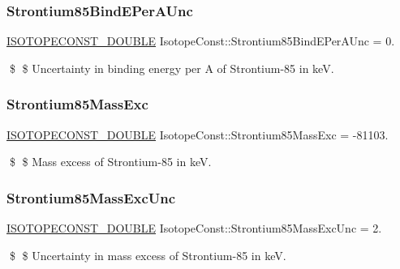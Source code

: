 \subsubsection{\texorpdfstring{Strontium85\+Bind\+E\+Per\+A\+Unc}{Strontium85BindEPerAUnc}}
{\footnotesize\ttfamily \mbox{\hyperlink{group___isotope_const-_macros_ga8f45a7272ce02c0b4c65c44636ed719a}{I\+S\+O\+T\+O\+P\+E\+C\+O\+N\+S\+T\+\_\+\+D\+O\+U\+B\+LE}} Isotope\+Const\+::\+Strontium85\+Bind\+E\+Per\+A\+Unc = 0.}

\$ \$ Uncertainty in binding energy per A of Strontium-\/85 in keV. \mbox{\label{group___isotope_const-_strontium-_sr85_ga41e2d2e7b08382506172b717660f2d0c}} 
\subsubsection{\texorpdfstring{Strontium85\+Mass\+Exc}{Strontium85MassExc}}
{\footnotesize\ttfamily \mbox{\hyperlink{group___isotope_const-_macros_ga8f45a7272ce02c0b4c65c44636ed719a}{I\+S\+O\+T\+O\+P\+E\+C\+O\+N\+S\+T\+\_\+\+D\+O\+U\+B\+LE}} Isotope\+Const\+::\+Strontium85\+Mass\+Exc = -\/81103.}

\$ \$ Mass excess of Strontium-\/85 in keV. \mbox{\label{group___isotope_const-_strontium-_sr85_gaac81bdfba33b467575c29cc787ed792b}} 
\subsubsection{\texorpdfstring{Strontium85\+Mass\+Exc\+Unc}{Strontium85MassExcUnc}}
{\footnotesize\ttfamily \mbox{\hyperlink{group___isotope_const-_macros_ga8f45a7272ce02c0b4c65c44636ed719a}{I\+S\+O\+T\+O\+P\+E\+C\+O\+N\+S\+T\+\_\+\+D\+O\+U\+B\+LE}} Isotope\+Const\+::\+Strontium85\+Mass\+Exc\+Unc = 2.}

\$ \$ Uncertainty in mass excess of Strontium-\/85 in keV. \mbox{\label{group___isotope_const-_strontium-_sr85_gacf5aaab3b0ab5a8f7a1824c959ed262c}} 
